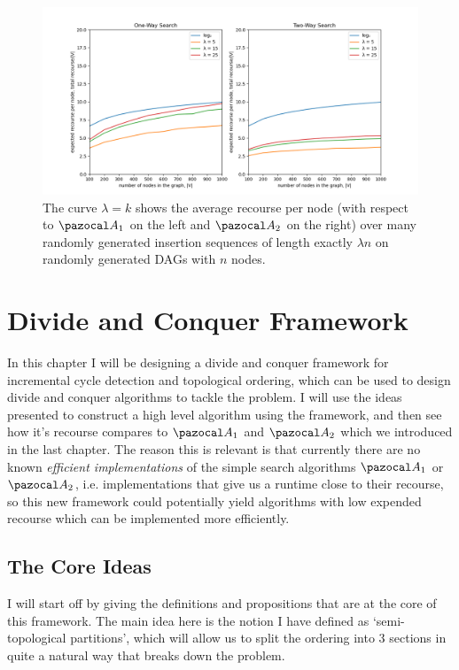 \documentclass{report}
\begin{document}
\begin{figure}[htp]
    \centering
    \centerline{\includegraphics[width=18cm]{Images/simple algo tests.png}}
    \caption{The curve $\lambda = k$ shows the average recourse per node (with respect to $\pazocal A_1$ on the left and $\pazocal A_2$ on the right) over many randomly generated insertion sequences of length exactly $\lambda n$ on randomly generated DAGs with $n$ nodes.}
    \label{fig:recoursetests1}
\end{figure}

\chapter{Divide and Conquer Framework}\label{chapter4}

In this chapter I will be designing a divide and conquer framework for incremental cycle detection and topological ordering, which can be used to design divide and conquer algorithms to tackle the problem. I will use the ideas presented to construct a high level algorithm using the framework, and then see how it's recourse compares to $\pazocal A_1$ and $\pazocal A_2$ which we introduced in the last chapter. The reason this is relevant is that currently there are no known \textit{efficient implementations} of the simple search algorithms $\pazocal A_1$ or $\pazocal A_2$, i.e. implementations that give us a runtime close to their recourse, so this new framework could potentially yield algorithms with low expended recourse which can be implemented more efficiently.

\section{The Core Ideas}

I will start off by giving the definitions and propositions that are at the core of this framework. The main idea here is the notion I have defined as `semi-topological partitions', which will allow us to split the ordering into 3 sections in quite a natural way that breaks down the problem.
\end{document}
